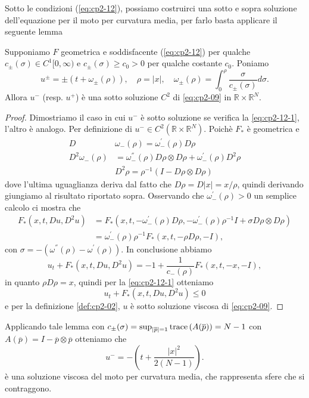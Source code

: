 \begin{osservazione}
Sotto le condizioni (\hyperref[eq:cp2-12-1]{\ref{eq:cp2-12}\ped{$\pm$}}), possiamo costruirci una sotto e sopra soluzione dell'equazione per il moto per curvatura media, per farlo basta applicare il seguente lemma
\begin{lemma}
Supponiamo $F$ geometrica e soddisfacente (\hyperref[eq:cp2-12-1]{\ref{eq:cp2-12}\ped{$\pm$}}) per qualche $c_{\pm}(\sigma)\in C^1[0,\infty)$ e $c_{\pm}(\sigma)\geq c_0>0$ per qualche costante $c_0$. Poniamo \[
u^{\pm}=\pm(t+\omega_{\pm}(\rho)),\quad \rho=|x|,\quad\omega_{\pm}(\rho)=\int_0^{\rho}\frac{\sigma}{c_{\pm}(\sigma)}d\sigma.
\]
Allora $u^-$ (resp. $u^+$) è una  sotto soluzione $C^2$ di \eqref{eq:cp2-09} in $\mathbb{R}\times\mathbb{R}^N$.
\end{lemma}
\begin{proof}
Dimostriamo il caso in cui $u^-$ è sotto soluzione se verifica la \eqref{eq:cp2-12-1}, l'altro è analogo. Per definizione di $u^-\in C^2(\mathbb{R}\times\mathbb{R}^N)$. Poichè $F_*$ è geometrica e
\[
\begin{aligned}
D&\omega_{-}(\rho)=\omega_{-}^{'}(\rho)D\rho \\
D^2\omega_{-}(\rho)&=\omega_{-}^{''}(\rho)D\rho\otimes D\rho+\omega_{-}^{'}(\rho)D^2\rho \\
&D^2\rho = \rho^{-1}(I-D\rho\otimes D\rho)
\end{aligned}
\]
dove l'ultima uguaglianza deriva dal fatto che $D\rho = D|x| = x/\rho$, quindi derivando giungiamo al risultato riportato sopra. Osservando che $\omega_{-}^{'}(\rho)> 0$ un semplice calcolo ci mostra che
\[
\begin{aligned}
F_*(x,t,Du,D^2u) &= F_{*}(x,t,-\omega_{-}^{'}(\rho)D\rho,-\omega_{-}^{'}(\rho)\rho^{-1}I+\sigma D\rho\otimes D\rho) \\
&=\omega_{-}^{'}(\rho)\rho^{-1}F_*(x,t,-\rho D\rho,-I),
\end{aligned}
\] 
con $\sigma = -(\omega^{''}(\rho)-\omega^{'}(\rho))$.
In conclusione abbiamo
\[
u_t + F_*(x,t,Du,D^2u) = -1 + \frac{1}{c_{-}(\rho)}F_*(x,t,-x,-I),
\]
in quanto  $\rho D\rho=x$, quindi per la \eqref{eq:cp2-12-1} otteniamo
\[
u_t + F_*(x,t,Du,D^2u)\leq 0
\]
e per la definizione \ref{def:cp2-02}, $u$ è sotto soluzione viscosa di \eqref{eq:cp2-09}.
\end{proof}
Applicando tale lemma con $c_{\pm}(\sigma)=\sup_{|\overline{p}|=1}\operatorname{trace}\left(A(\overline{p})\right)=N-1$ con $A(\overline{p})=I-\overline{p}\otimes\overline{p}$ otteniamo che
\[
u^{-}=-\left(t+\frac{|x|^2}{2(N-1)}\right).
\]
è una soluzione viscosa del moto per curvatura media, che rappresenta sfere che si contraggono. 
\end{osservazione}
